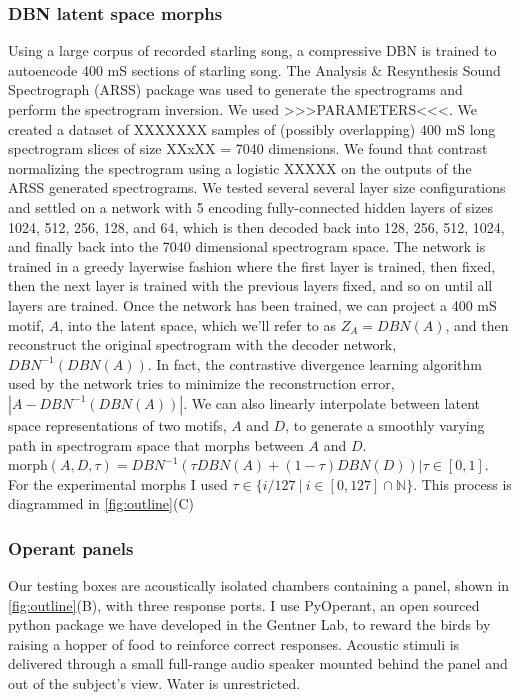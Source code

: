 \subsubsection{\ac{DBN} latent space morphs}
Using a large corpus of recorded starling song, a compressive \ac{DBN} \cite{hinton2006reducing} is trained to autoencode 400 mS sections of starling song. The Analysis \& Resynthesis Sound Spectrograph (ARSS) package was used to generate the spectrograms and perform the spectrogram inversion. We used >>>PARAMETERS<<<. We created a dataset of XXXXXXX samples of (possibly overlapping) 400 mS long spectrogram slices of size XXxXX = 7040 dimensions. We found that contrast normalizing the spectrogram using a logistic XXXXX on the outputs of the ARSS generated spectrograms. We tested several several layer size configurations and settled on a network with 5 encoding fully-connected hidden layers of sizes 1024, 512, 256, 128, and 64, which is then decoded back into 128, 256, 512, 1024, and finally back into the 7040 dimensional spectrogram space. The network is trained in a greedy layerwise fashion where the first layer is trained, then fixed, then the next layer is trained with the previous layers fixed, and so on until all layers are trained. Once the network has been trained, we can project a 400 mS motif, $A$, into the latent space, which we'll refer to as $Z_A = DBN(A)$, and then reconstruct the original spectrogram with the decoder network, $DBN^{-1}(DBN(A))$. In fact, the contrastive divergence learning algorithm used by the network tries to minimize the reconstruction error, $|A - DBN^{-1}(DBN(A))|$. We can also linearly interpolate between latent space representations of two motifs, $A$ and $D$, to generate a smoothly varying path in spectrogram space that morphs between $A$ and $D$. $\text{morph}(A, D, \tau) = DBN^{-1}(\tau DBN(A) + (1 - \tau) DBN(D)) | \tau \in [0, 1]$. For the experimental morphs I used $\tau \in \{ i/127\ |\ i \in [0, 127] \cap \mathbb{N}\}$. This process is diagrammed in \ref{fig:outline}(C)

\subsubsection{Operant panels}
Our testing boxes are acoustically isolated chambers containing a panel, shown in \ref{fig:outline}(B), with three response ports. I use PyOperant, an open sourced python package we have developed in the Gentner Lab, to reward the birds by raising a hopper of food to reinforce correct responses. Acoustic stimuli is delivered through a small full-range audio speaker mounted behind the panel and out of the subject's view. Water is unrestricted.

